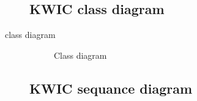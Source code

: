\documentclass[11pt,a4paper]{article}
\begin{document}
\begin{description}
\subsection{KWIC class diagram}
    \item[class diagram]    
     \begin{figure}[htb]
         \begin{center}
             \setlength\fboxsep{0pt}
             \caption{Class diagram}
             \label{fig:class_diag}
        \end{center}
\end{figure}


\subsection{KWIC sequance diagram}


\end{description}
\end{document}
